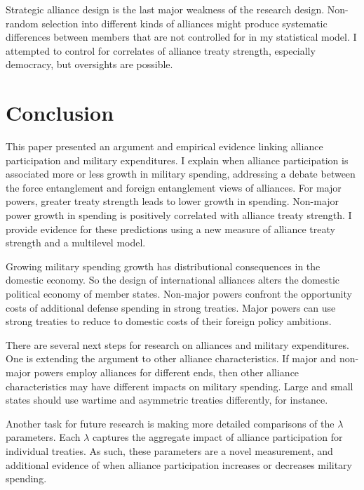 \documentclass[12pt]{article}
\begin{document}
Strategic alliance design is the last major weakness of the research design. 
Non-random selection into different kinds of alliances might produce systematic differences between members that are not controlled for in my statistical model. 
I attempted to control for correlates of alliance treaty strength, especially democracy, but oversights are possible. 



\section{Conclusion}


This paper presented an argument and empirical evidence linking alliance participation and military expenditures. 
I explain when alliance participation is associated more or less growth in military spending, addressing a debate between the force entanglement and foreign entanglement views of alliances. 
For major powers, greater treaty strength leads to lower growth in spending. 
Non-major power growth in spending is positively correlated with alliance treaty strength. 
I provide evidence for these predictions using a new measure of alliance treaty strength and a multilevel model. 


Growing military spending growth has distributional consequences in the domestic economy. 
So the design of international alliances alters the domestic political economy of member states. 
Non-major powers confront the opportunity costs of additional defense spending in strong treaties.
Major powers can use strong treaties to reduce to domestic costs of their foreign policy ambitions.  


There are several next steps for research on alliances and military expenditures. 
One is extending the argument to other alliance characteristics. 
If major and non-major powers employ alliances for different ends, then other alliance characteristics may have different impacts on military spending. 
Large and small states should use wartime and asymmetric treaties differently, for instance. 


Another task for future research is making more detailed comparisons of the $\lambda$ parameters. 
Each $\lambda$ captures the aggregate impact of alliance participation for individual treaties.
As such, these parameters are a novel measurement, and additional evidence of when alliance participation increases or decreases military spending. 
\end{document}
